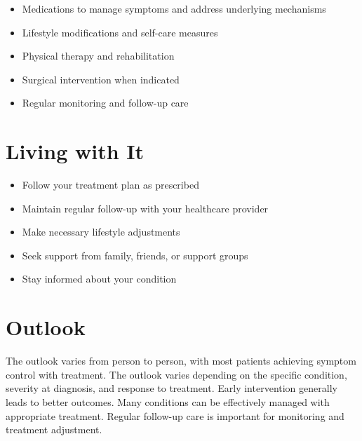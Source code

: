 \begin{itemize}[noitemsep]
  \item Medications to manage symptoms and address underlying mechanisms
  \item Lifestyle modifications and self-care measures
  \item Physical therapy and rehabilitation
  \item Surgical intervention when indicated
  \item Regular monitoring and follow-up care
\end{itemize}
\section{Living with It}
\begin{itemize}[noitemsep]
  \item Follow your treatment plan as prescribed
  \item Maintain regular follow-up with your healthcare provider
  \item Make necessary lifestyle adjustments
  \item Seek support from family, friends, or support groups
  \item Stay informed about your condition
\end{itemize}
\section{Outlook}
The outlook varies from person to person, with most patients achieving symptom control with treatment. The outlook varies depending on the specific condition, severity at diagnosis, and response to treatment. Early intervention generally leads to better outcomes. Many conditions can be effectively managed with appropriate treatment. Regular follow-up care is important for monitoring and treatment adjustment.
